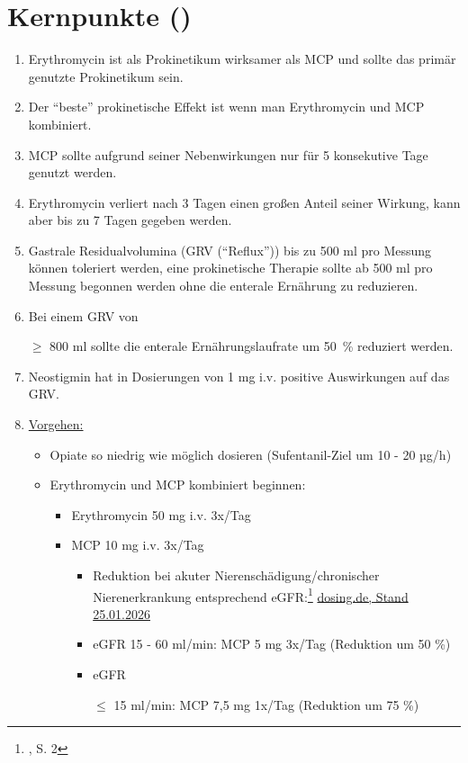 \documentclass{article}
\begin{document}
\section{Kernpunkte ()} %
\begin{enumerate}
  \item Erythromycin ist als Prokinetikum wirksamer als MCP und sollte das primär genutzte Prokinetikum sein.
  \item Der \enquote{beste} prokinetische Effekt ist wenn man Erythromycin und MCP kombiniert.
  \item MCP sollte aufgrund seiner Nebenwirkungen nur für 5 konsekutive Tage genutzt werden.
  \item Erythromycin verliert nach 3 Tagen einen großen Anteil seiner Wirkung, kann aber bis zu 7 Tagen gegeben werden.
  \item Gastrale Residualvolumina (GRV (\enquote{Reflux})) bis zu 500 ml pro Messung können toleriert werden, eine prokinetische Therapie sollte ab 500 ml pro Messung begonnen werden ohne die enterale Ernährung zu reduzieren.
  \item Bei einem GRV von $\geq$ 800 ml sollte die enterale Ernährungslaufrate um 50~\% reduziert werden.
  \item Neostigmin hat in Dosierungen von 1 mg i.v. positive Auswirkungen auf das GRV.  
  \item \uline{Vorgehen:}
    \begin{itemize}
      \item[-] Opiate so niedrig wie möglich dosieren (Sufentanil-Ziel um 10 - 20 µg/h)
      \item[-] Erythromycin und MCP kombiniert beginnen: 
        \begin{itemize}
          \item[-] Erythromycin 50 mg i.v. 3x/Tag
          \item[-] MCP 10 mg i.v. 3x/Tag
            \begin{itemize}
              \item[-] Reduktion bei akuter Nierenschädigung/chronischer Nierenerkrankung entsprechend eGFR:\footnote{\cite{MCPratiopharm10Mg}, S. 2} \href{https://dosing.de/popup_niere.php?monoid=450}{dosing.de, Stand 25.01.2026}
              \item[-] eGFR 15 - 60 ml/min: MCP 5 mg 3x/Tag (Reduktion um 50 \%)
              \item[-] eGFR $\leq$ 15 ml/min: MCP 7,5 mg 1x/Tag (Reduktion um 75 \%)

\end{itemize}
\end{itemize}
\end{itemize}
\end{enumerate}
\end{document}
